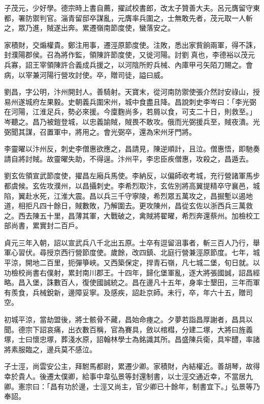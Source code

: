 \begin{pinyinscope}
 子茂元，少好學。德宗時上書自薦，擢試校書郎，改太子贊善大夫。呂元膺留守東都，署防禦判官。淄青留邸卒謀亂，元膺率兵圍之，士無敢先者，茂元取一人斬之，眾乃進，賊遂出奔。累遷嶺南節度使，蠻落安之。



 家積財，交煽權貴。鄭注用事，遷涇原節度使。注敗，悉出家貲餉兩軍，得不誅，封濮陽郡侯。召為將作監，領陳許節度使，又徙河陽。討劉真也，李德裕以茂元兵寡，詔王宰領陳許合義成兵援之，以河陰所貯兵械、內庫甲弓矢陌刀賜之。會病，以宰兼河陽行營攻討使。卒，贈司徒，謚曰威。



 劉昌，字公明，汴州開封人。善騎射。天寶末，從河南防禦使張介然討安祿山，授易州遂城府左果毅。史朝義兵圍宋州，城中食盡且降。昌說刺史李岑曰：「李光弼在河陽，江淮足兵，勢必來援。今廩麴尚多，若屑以食，可支二十日，則救至。」岑聽之。昌乃被鎧登城，以忠義諭賊，賊畏不敢攻。俄而光弼援兵至，賊夜潰。光弼聞其謀，召置軍中，將用之。會光弼卒，還為宋州牙門將。



 李靈曜以汴州反，刺史李僧惠欲應之，昌請見，陳逆順計，且泣。僧惠悟，即馳奏請自將討賊。故靈曜失助，不得逞。汴州平，李忠臣疾僧惠，攻殺之，昌遁去。



 劉玄佐領宣武節度使，擢昌左廂兵馬使。李納反，以偏師收考城，充行營諸軍馬步都虞候。玄佐攻濮州，以昌攝刺史。李希烈取汴，玄佐別將高翼提精卒守襄邑，城陷，翼赴水死，江淮大震。昌以兵三千守寧陵，希烈眾五萬攻之，昌掘塹以遏地道，相拒凡四十餘日，賊數敗，乃解圍去。更攻陳州，昌從玄佐以浙西兵三萬救之。西去陳五十里，昌薄其軍，大戰破之，禽賊將翟曜，希烈奔還蔡州。加檢校工部尚書，累實封二百戶。



 貞元三年入朝，詔以宣武兵八千北出五原。士卒有逗留沮事者，斬三百人乃行，舉軍心習伏。尋授京西行營節度使。歲餘，改四鎮、北庭行營兼涇原節度。七年，城平涼，開地二百里，扼彈箏峽。又西築保定，捍青石嶺，凡七城二堡，旬日就。以功檢校尚書右僕射，累封南川郡王。十四年，歸化堡軍亂，逐大將張國誠，詔昌經略。昌入堡，誅數百人，復使國誠統之。昌在邊凡十五年，身率士墾田，三年而軍有羨食，兵械銳新，邊障妥寧。及感疾，詔赴京師。未行，卒，年六十五，贈司空。



 初城平涼，當劫盟後，將士骸骨不藏，昌始命瘞之。夕夢若詣昌厚謝者，昌具以聞。德宗下詔哀痛，出衣數百稱，官為賽具，斂以棺槥，分建二塚，大將曰旌義塚，士曰懷忠塚，葬淺水原，詔翰林學士為銘識其所。昌盛陳兵衛，具牢醴，率諸將素服臨之，邊兵莫不感泣。



 子士涇，尚雲安公主，拜駙馬都尉，累遷少卿。家積財，內結權近。善胡琴，故得幸於貴人。後遷太僕卿，給事中韋弘景等封還制書，以士涇交通近幸，不當居九卿。憲宗曰：「昌有功於邊，士涇又尚主，官少卿已十餘年，制書宜下。」弘景等乃奉詔。




\end{pinyinscope}
